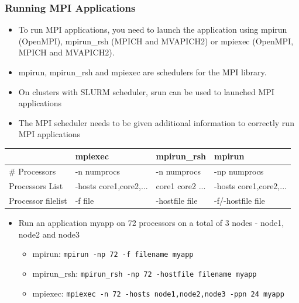 \documentclass[10pt,t]{beamer}
\begin{document}
\begin{frame}
  \frametitle{Running MPI Applications}
  \begin{itemize}
  \item To run MPI applications, you need to launch the application using mpirun (OpenMPI), mpirun\_rsh (MPICH and MVAPICH2) or mpiexec (OpenMPI, MPICH and MVAPICH2).
  \item mpirun, mpirun\_rsh and mpiexec are schedulers for the MPI library.
  \item On clusters with SLURM scheduler, srun can be used to launched MPI applications
  \item The MPI scheduler needs to be given additional information to correctly run MPI applications
  \end{itemize}
  \begin{center}
    \begin{tabular}{|faaa|}
      \hline
      & mpiexec & mpirun\_rsh & mpirun \\
      \hline
      \# Processors & -n numprocs & -n numprocs & -np numprocs \\
      Processors List & -hosts core1,core2,... & core1 core2 ... & -hosts core1,core2,... \\
      Processor filelist & -f file & -hostfile file & -f/-hostfile file \\
      \hline
    \end{tabular}
  \end{center}
  \begin{itemize}
    \item Run an application myapp on 72 processors on a total of 3 nodes - node1, node2 and node3 
      \begin{itemize}
        \item mpirun: \lstinline|mpirun -np 72 -f filename myapp|
        \item mpirun\_rsh: \lstinline|mpirun_rsh -np 72 -hostfile filename myapp|
        \item mpiexec: \lstinline|mpiexec -n 72 -hosts node1,node2,node3 -ppn 24 myapp|
      \end{itemize}
  \end{itemize}
\end{frame}
\end{document}

